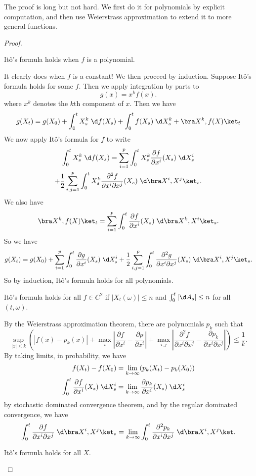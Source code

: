 \documentclass[a4paper]{article}
\begin{document}
The proof is long but not hard. We first do it for polynomials by explicit computation, and then use Weierstrass approximation to extend it to more general functions.
\begin{proof}
  \begin{claim}
    It\^o's formula holds when $f$ is a polynomial.
  \end{claim}
  It clearly does when $f$ is a constant! We then proceed by induction. Suppose It\^o's formula holds for some $f$. Then we apply integration by parts to
  \[
    g(x) = x^k f(x).
  \]
  where $x^k$ denotes the $k$th component of $x$. Then we have
  \[
    g(X_t) = g(X_0) + \int_0^t X_s^k \;\d f(X_s) + \int_0^t f(X_s) \;\d X_s^k + \bra X^k, f(X)\ket_t
  \]
  We now apply It\^o's formula for $f$ to write
  \begin{multline*}
    \int_0^t X_s^k \;\d f(X_s) = \sum_{i = 1}^p \int_0^t X_s^k \frac{\partial f}{\partial x^i}(X_s) \;\d X_s^i\\
    + \frac{1}{2} \sum_{i, j = 1}^p \int_0^t X_s^k \frac{\partial^2f}{\partial x^i \partial x^j} (X_s)\;\d \bra X^i, X^j\ket_s.
  \end{multline*}
  We also have
  \[
    \bra X^k, f(X)\ket_t = \sum_{i = 1}^p \int_0^t \frac{\partial f}{\partial x^i}(X_s) \;\d \bra X^k, X^i\ket_s.
  \]
  So we have
  \[
    g(X_t) = g(X_0) + \sum_{i = 1}^p \int_0^t \frac{\partial g}{\partial x^i}(X_s) \;\d X_s^i + \frac{1}{2} \sum_{i, j = 1}^p \int_0^t \frac{\partial^2 g}{\partial x^i \partial x^j} (X_s) \;\d \bra X^i, X^j\ket_s.
  \]
  So by induction, It\^o's formula holds for all polynomials.

  \begin{claim}
    It\^o's formula holds for all $f \in C^2$ if $|X_t(\omega)| \leq n$ and $\int_0^t |\d A_s| \leq n$ for all $(t, \omega)$.
  \end{claim}

  By the Weierstrass approximation theorem, there are polynomials $p_k$ such that
  \[
    \sup_{|x| \leq k} \left(|f(x) - p_k(x)| + \max_i \left|\frac{\partial f}{\partial x^i} - \frac{\partial p}{\partial x^i}\right| + \max_{i, j} \left|\frac{\partial^2 f}{\partial x^i \partial x^j} - \frac{\partial p_k}{\partial x^i \partial x^j}\right| \right) \leq \frac{1}{k}.
  \]
  By taking limits, in probability, we have
  \begin{align*}
    f(X_t) - f(X_0) &= \lim_{k \to \infty} (p_k(X_t) - p_k(X_0))\\
    \int_0^t \frac{\partial f}{\partial x^i} (X_s) \;\d X_s^i &= \lim_{k \to \infty} \frac{\partial p_k}{\partial x^i} (X_s) \;\d X_s^i
  \end{align*}
  by stochastic dominated convergence theorem, and by the regular dominated convergence, we have
  \[
    \int_0^t \frac{\partial f}{\partial x^i \partial x^j} \;\d \bra X^i, X^j\ket_s = \lim_{k \to \infty} \int_0^t \frac{\partial^2 p_k}{\partial x^i \partial x^j} \;\d \bra X^i, X^j\ket.
  \]
  \begin{claim}
    It\^o's formula holds for all $X$.
  \end{claim}


\end{proof}
\end{document}
